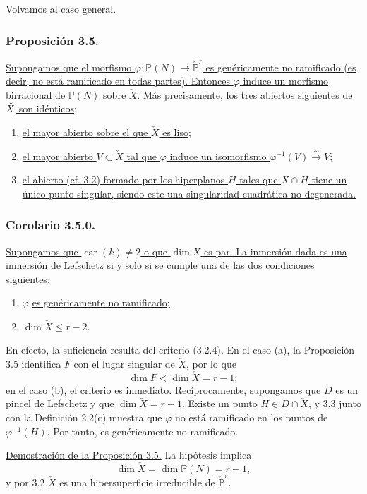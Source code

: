 Volvamos al caso general.

\pageoriginale

\subsubsection*{Proposición 3.5.}
\underline{Supongamos que el morfismo
$\varphi:\mathbb P(N)\to\check{\mathbb P}^{r}$ es genéricamente no
ramificado (es decir, no está ramificado en todas partes). Entonces
$\varphi$ induce un morfismo birracional de $\mathbb P(N)$ sobre
$\check X$. Más precisamente, los tres abiertos siguientes de
$\sisi{X}{\check X}$ son idénticos}:
\begin{enumerate}
\item[(a)] \underline{el mayor abierto sobre el que $\check X$ es
liso;}
\item[(b)] \underline{el mayor abierto $V\subset\check X$ tal que
$\varphi$ induce un isomorfismo
$\varphi^{-1}(V)\xrightarrow{\sim}V$;}
\item[(c)] \underline{el abierto (cf. 3.2) formado por los
hiperplanos $H$ tales que $X\cap H$ tiene un único punto singular,
siendo este una singularidad cuadrática no degenerada.}
\end{enumerate}

\subsubsection*{Corolario 3.5.0.}
\underline{Supongamos que $\operatorname{car}(k)\ne2$ o que $\dim X$
es par. La inmersión dada es una inmersión de Lefschetz si y solo si
se cumple una de las dos condiciones siguientes}:
\begin{enumerate}
\item[(a)] $\varphi$ \underline{es genéricamente no ramificado;}
\item[(b)] $\dim\check X\leq r-2$.
\end{enumerate}

En efecto, la suficiencia resulta del criterio (3.2.4). En el caso
(a), la Proposición 3.5 identifica $F$ con el lugar singular de
$\check X$, por lo que
\[
\dim F<\dim\check X=r-1;
\]
en el caso (b), el criterio es inmediato. Recíprocamente, supongamos
que $D$ es un pincel de Lefschetz y que $\dim\check X=r-1$. Existe un
punto $H\in D\cap\check X$, y 3.3 junto con la Definición 2.2(c)
muestra que $\varphi$ no está ramificado en los puntos de
$\varphi^{-1}(H)$. Por tanto, es genéricamente no ramificado.

\noindent\underline{Demostración de la Proposición 3.5.}
La hipótesis implica
\[
\dim\check X=\dim\mathbb P(N)=r-1,
\]
y por 3.2 $\check X$ es una hipersuperficie irreducible de
$\check{\mathbb P}^{r}$.

